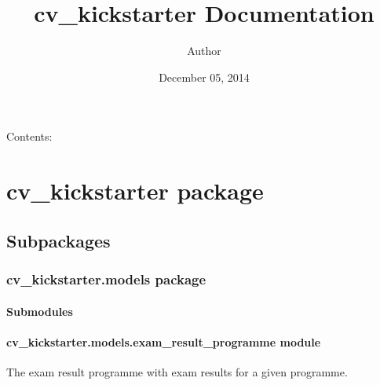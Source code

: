 \documentclass[letterpaper,10pt,english]{sphinxmanual}
\title{cv\_kickstarter Documentation}
\date{December 05, 2014}
\author{Author}
\begin{document}
\maketitle
\tableofcontents
{}\label{index::doc}


Contents:


\chapter{cv\_kickstarter package}
\label{cv_kickstarter:welcome-to-cv-kickstarter-s-documentation}\label{cv_kickstarter:cv-kickstarter-package}\label{cv_kickstarter::doc}

\section{Subpackages}
\label{cv_kickstarter:subpackages}

\subsection{cv\_kickstarter.models package}
\label{cv_kickstarter.models:cv-kickstarter-models-package}\label{cv_kickstarter.models::doc}

\subsubsection{Submodules}
\label{cv_kickstarter.models:submodules}

\subsubsection{cv\_kickstarter.models.exam\_result\_programme module}
\label{cv_kickstarter.models:module-cv_kickstarter.models.exam_result_programme}\label{cv_kickstarter.models:cv-kickstarter-models-exam-result-programme-module}
The exam result programme with exam results for a given programme.
\end{document}
